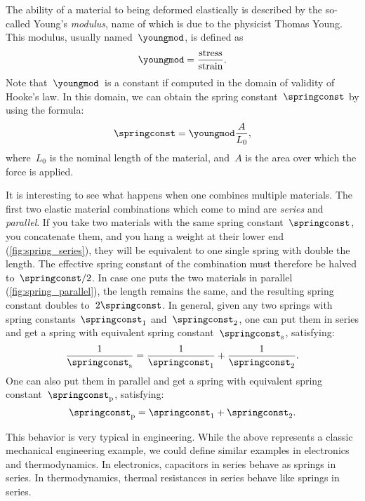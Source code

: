     The ability of a material to being deformed elastically is described by the so-called Young's \emph{modulus}, name of which is due to the physicist Thomas Young.
    This modulus, usually named~$\youngmod$, is defined as
    \begin{equation*}
        \youngmod=\frac{\text{stress}}{\text{strain}}.
    \end{equation*}
    Note that~$\youngmod$~is a constant if computed in the domain of validity of Hooke's law.
    In this domain, we can obtain the spring constant~$\springconst$ by using the formula:
    \begin{equation*}
        \springconst=\youngmod \frac{A}{L_0},
    \end{equation*}
    where~$L_0$ is the nominal length of the material, and~$A$ is the area over which the force is applied.

    It is interesting to see what happens when one combines multiple materials.
    The first two elastic material combinations which come to mind are \emph{series} and \emph{parallel}.
    If you take two materials with the same spring constant~$\springconst$, you concatenate them, and you hang a weight at their lower end (\cref{fig:spring_series}), they will be equivalent to one single spring with double the length.
    The effective spring constant of the combination must therefore be halved to~$\springconst/2$.
    In case one puts the two materials in parallel (\cref{fig:spring_parallel}), the length remains the same, and the resulting spring constant doubles to~$2\springconst$.
    In general, given any two springs with spring constants~$\springconst_1$ and~$\springconst_2$, one can put them in series and get a spring with equivalent spring constant~$\springconst_{\mathrm{s}}$, satisfying:
    \begin{equation*}
        \frac{1}{\springconst_\mathrm{s}}=\frac{1}{\springconst_1}+\frac{1}{\springconst_2}.
    \end{equation*}
    One can also put them in parallel and get a spring with equivalent spring constant~$\springconst_\mathrm{p}$, satisfying:
\begin{equation*}
    \springconst_\mathrm{p}=\springconst_1+\springconst_2.
\end{equation*}

\begin{remark}
    This behavior is very typical in engineering.
    While the above represents a classic mechanical engineering example, we could define similar examples in electronics and thermodynamics.
    In electronics, capacitors in series behave as springs in series.
    In thermodynamics, thermal resistances in series behave like springs in series.
\end{remark}

